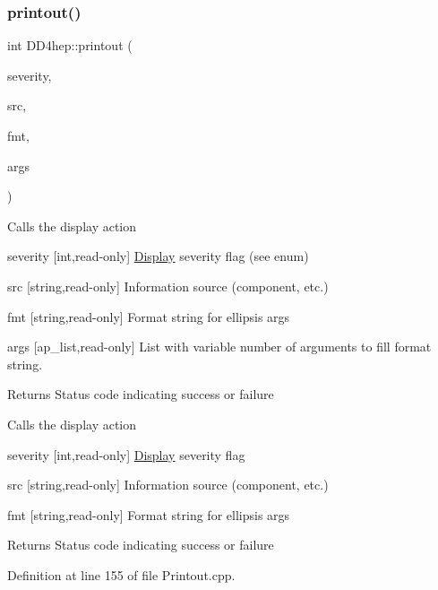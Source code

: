 \hypertarget{namespace_d_d4hep_ad4be91cbf746f4c9fc6f175c371c14c3}{}\label{namespace_d_d4hep_ad4be91cbf746f4c9fc6f175c371c14c3} 
\subsubsection{\texorpdfstring{printout()}{printout()}\hspace{0.1cm}{\footnotesize\ttfamily [5/8]}}
{\footnotesize\ttfamily int D\+D4hep\+::printout (\begin{DoxyParamCaption}\item[{\hyperlink{namespace_d_d4hep_a5b5a64d56252469451f2020a27d57d42}{Print\+Level}}]{severity,  }\item[{const char $\ast$}]{src,  }\item[{const char $\ast$}]{fmt,  }\item[{va\+\_\+list \&}]{args }\end{DoxyParamCaption})}

Calls the display action \begin{DoxyItemize}
\item severity \mbox{[}int,read-\/only\mbox{]} \hyperlink{class_d_d4hep_1_1_display}{Display} severity flag (see enum) \item src \mbox{[}string,read-\/only\mbox{]} Information source (component, etc.) \item fmt \mbox{[}string,read-\/only\mbox{]} Format string for ellipsis args \item args \mbox{[}ap\+\_\+list,read-\/only\mbox{]} List with variable number of arguments to fill format string. \begin{DoxyReturn}{Returns}
Status code indicating success or failure
\end{DoxyReturn}
Calls the display action \item severity \mbox{[}int,read-\/only\mbox{]} \hyperlink{class_d_d4hep_1_1_display}{Display} severity flag \item src \mbox{[}string,read-\/only\mbox{]} Information source (component, etc.) \item fmt \mbox{[}string,read-\/only\mbox{]} Format string for ellipsis args \begin{DoxyReturn}{Returns}
Status code indicating success or failure 
\end{DoxyReturn}
\end{DoxyItemize}


Definition at line 155 of file Printout.\+cpp.

